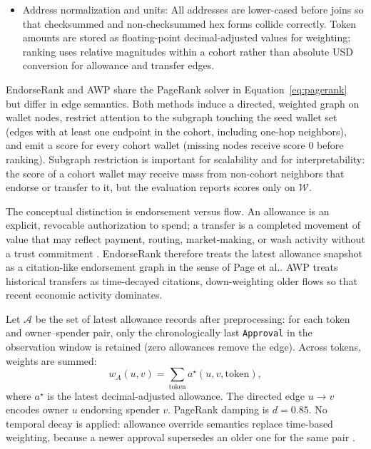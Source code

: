 \begin{itemize}
\item Address normalization and units: All addresses are lower-cased before joins so that checksummed and non-checksummed hex forms collide correctly. Token amounts are stored as floating-point decimal-adjusted values for weighting; ranking uses relative magnitudes within a cohort rather than absolute USD conversion for allowance and transfer edges.

\end{itemize}


EndorseRank and AWP share the PageRank solver in Equation~\eqref{eq:pagerank} but differ in edge semantics. Both methods induce a directed, weighted graph on wallet nodes, restrict attention to the subgraph touching the seed wallet set (edges with at least one endpoint in the cohort, including one-hop neighbors), and emit a score for every cohort wallet (missing nodes receive score $0$ before ranking). Subgraph restriction is important for scalability and for interpretability: the score of a cohort wallet may receive mass from non-cohort neighbors that endorse or transfer to it, but the evaluation reports scores only on $\mathcal{W}$.

The conceptual distinction is endorsement versus flow. An allowance is an explicit, revocable authorization to spend; a transfer is a completed movement of value that may reflect payment, routing, market-making, or wash activity without a trust commitment . EndorseRank therefore treats the latest allowance snapshot as a citation-like endorsement graph in the sense of Page et al.. AWP treats historical transfers as time-decayed citations, down-weighting older flows so that recent economic activity dominates.


Let $\mathcal{A}$ be the set of latest allowance records after preprocessing: for each token and owner--spender pair, only the chronologically last \texttt{Approval} in the observation window is retained (zero allowances remove the edge). Across tokens, weights are summed:
\begin{equation}
\label{eq:approve-weight}
w_A(u,v)
=
\sum_{\mathrm{token}}
a^{\star}(u,v,\mathrm{token}),
\end{equation}
where $a^{\star}$ is the latest decimal-adjusted allowance. The directed edge $u\to v$ encodes owner $u$ endorsing spender $v$. PageRank damping is $d=0.85$. No temporal decay is applied: allowance override semantics replace time-based weighting, because a newer approval supersedes an older one for the same pair .

